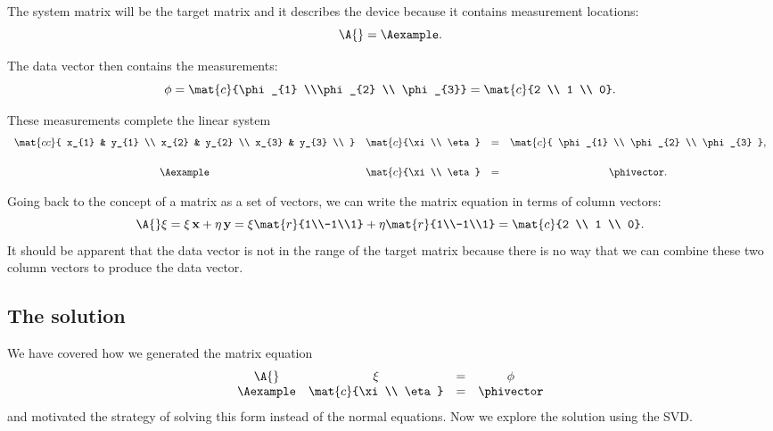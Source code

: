 The system matrix will be the target matrix and it describes the device because it contains measurement locations:
\begin{equation}
  \A{} = \Aexample.
\label{eq:simple:IamA}
\end{equation}

The data vector then contains the measurements:
\begin{equation}
  \phi = \mat{c}{\phi_{1} \\\phi_{2} \\ \phi_{3}} = \mat{c}{2 \\ 1 \\ 0}.
  \label{eq:phi}
\end{equation}

These measurements complete the linear system
\begin{equation}
\begin{array}{cccc}
    \mat{cc}
    {
    x_{1} & y_{1} \\
    x_{2} & y_{2} \\
    x_{3} & y_{3} \\
    }
    &\mat{c}{\xi\\ \eta}
    &=
    &\mat{c}
    {
    \phi_{1} \\
    \phi_{2} \\
    \phi_{3}
    }, \\[16pt]
    \Aexample
    &\mat{c}{\xi\\ \eta}
    & =
    &\phivector.
\end{array}
\end{equation}

Going back to the concept of a matrix as a set of vectors, we can write the matrix equation in terms of column vectors:
\begin{equation}
  \A{} \xi = \xi\, \textbf{x} + \eta\, \textbf{y} = \xi \mat{r}{1\\-1\\1} + \eta \mat{r}{1\\-1\\1} = \mat{c}{2 \\ 1 \\ 0}.
\end{equation}
It should be apparent that the data vector is not in the range of the target matrix because there is no way that we can combine these two column vectors to produce the data vector.
\subsection{The solution}
We have covered how we generated the matrix equation
\begin{equation*}
\begin{array}{cccc}
    \A{} & \xi &=& \phi\\
    \Aexample
    & \mat{c}{\xi\\ \eta}
    & =
    &\phivector
    \label{eq:2:problem}
\end{array}
\end{equation*}
and motivated the strategy of solving this form instead of the normal equations. Now we explore the solution using the SVD.

